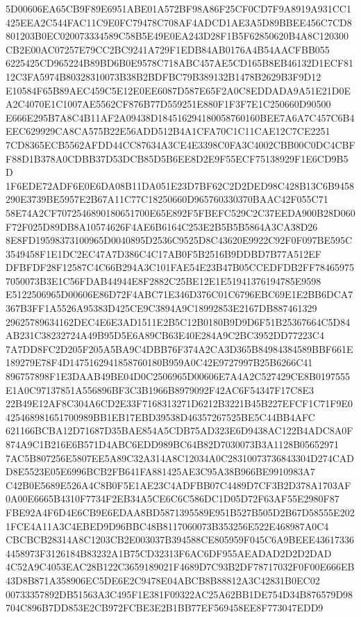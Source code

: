 \documentclass[UTF8,fontset=fandol,zihao=-4,a4paper]{ctexart}
\begin{document}
{{5D00606EA65CB9F89E6951ABE01A572BF98A86F25CF0CD7F9A8919A931CC1425EEA2C544FAC11C9E0FC79478C708AF4ADCD1AE3A5D89BBEE456C7CD8
801203B0EC020073334589C58B5E49E0EA243D28F1B5F62850620B4A8C120300CB2E00AC07257E79CC2BC9241A729F1EDB84AB0176A4B54AACFBB055
6225425CD965224B89BD6B0E9578C718ABC457AE5CD165B8EB46132D1ECF8112C3FA5974B80328310073B38B2BDFBC79B389132B1478B2629B3F9D12
E10584F65B89AEC459C5E12E0EE6087D587E65F2A0C8EDDADA9A51E21D0EA2C4070E1C1007AE5562CF876B77D559251E880F1F3F7E1C250660D90500
E666E295B7A8C4B11AF2A09438D184516294180058760160BEE7A6A7C457C6B4EEC629929CA8CA575B22E56ADD512B4A1CFA70C1C11CAE12C7CE2251
7CD8365ECB5562AFDD44CC87634A3CE4E3398C0FA3C4002CBB00C0DC4CBFF88D1B378A0CDBB37D53DCB85D5B6EE8D2E9F55ECF75138929F1E6CD9B5D
1F6EDE72ADF6E0E6DA08B11DA051E23D7BF62C2D2DED98C428B13C6B9458290E3739BE5957E2B67A11C77C18250660D965760330370BAAC42F055C71
58E74A2CF7072546890180651700E65E892F5FBEFC529C2C37EEDA900B28D060F72F025D89DB8A10574626F4AE6B6164C253E2B5B5B5864A3CA38D26
8E8FD19598373100965D0040895D2536C9525D8C43620E9922C92F0F097BE595C3549458F1E1DC2EC47A7D386C4C17AB0F5B2516B9DDBD7B77A512EF
DFBFDF28F12587C4C66B294A3C101FAE54E23B47B05CCEDFDB2FF784659757050073B3E1C56FDAB44944E8F2882C25BE12E1E51941376194785E9598
E5122506965D00606E86D72F4ABC71E346D376C01C6796EBC69E1E2BB6DCA7367B3FF1A5526A95383D425CE9C3894A9C18992853E2167DB887461329
29625789634162DEC4E6E3AD1511E2B5C12B0180B9D9D6F51B25367664C5D84AB231C38232724A49B95D5E6A89CB63E40E284A9C2BC3952DD77223C4
7A7DD8FC2D205F205A5BA9C4DBB76F374A2CA3D365B84984384589BBF661E189279E78F4D1475162941858760180B959A0C42E9727997B25B6266C41
896757898F1E3DAAB49BE04D0C2506965D00606E7A4A2C527429CE8B0197555E1A0C97137851A556896BF3C3B1966B8979092F42AC6F54347F17C8E3
22B49E12AF8C304A6CD2E33F7168313271D6212B3221B45B227EFCF1C71F9E0425468981651700989BB1EB17EBD39538D46357267525BE5C44BB4AFC
621166BCBA12D71687D35BAE854A5CDB75AD323E6D9438AC122B4ADC8A0F874A9C1B216E6B571D4ABC6EDD989BC64B82D7030073B3A1128B05652971
7AC5B807256E5807EE5A89C32A314A8C12034A0C28310073736843304D274CADD8E5523E05E6996BCB2FB641FA881425AE3C95A38B966BE9910983A7
C42B0E5689E526A4C8B0F5E1AE23C4ADFBB07C4489D7CF3B2D378A1703AF0A00E6665B4310F7734F2EB34A5CE6C6C586DC1D05D72F63AF55E2980F87
FBE92A4F6D4E6CB9E6EDAA8BD5871395589E951B527B505D2B67D58555E2021FCE4A11A3C4EBED9D96BBC48B8117060073B353256E522E468987A0C4
CBCBCB28314A8C1203CB2E003037B394588CE805959F045C6A9BEEE436173364458973F3126184B83232A1B75CD32313F6AC6DF955AEADAD2D2D2DAD
4C52A9C4053EAC28B122C3659189021F4689D7C93B2DF78717032F0F00E666EB43D8B871A358906EC5DE6E2C9478E04ABCB8B88812A3C42831B0EC02
00733357892DB51563A3C495F1E381F09322AC25A62BB1DE754D34B876579D98704C896B7DD853E2CB972FCBE3E2B1BB77EF569458EE8F773047EDD9
}}
\end{document}
